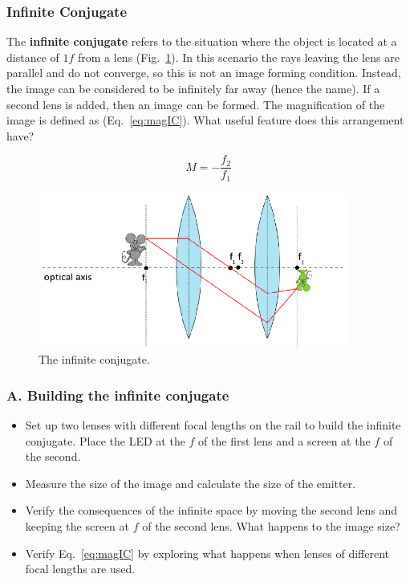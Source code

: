 \documentclass[a4paper]{report}
\begin{document}
\subsubsection{Infinite Conjugate}
The \textbf{infinite conjugate} refers to the situation where the
object is located at a distance of $1f$ from a lens
(Fig.~\ref{infiniteConjugate}). In this scenario the rays leaving the
lens are parallel and do not converge, so this is not an image forming
condition. Instead, the image can be considered to be infinitely far
away (hence the name). If a second lens is added, then an image can
be formed. The magnification of the image is defined as
(Eq.~\ref{eq:magIC}). 
What useful feature does this arrangement have? 

\begin{equation}
M=-\frac{f_2}{f_1}
\label{eq:magIC}
\end{equation}

\begin{figure}[h]
\center
\includegraphics[width=4in]{infiniteConjugate.eps}
\caption{The infinite conjugate.}
\label{infiniteConjugate}
\end{figure}
\subsubsection{A. Building the infinite conjugate}
\begin{itemize}
\item Set up two lenses with different focal lengths on the rail to build the infinite conjugate. 
Place the LED at the $f$ of the first lens and a screen at the $f$ of the second. 
\item Measure the size of the image and calculate the size of the emitter. 
\item Verify the consequences of the infinite space by moving the second lens and keeping the screen at $f$ of the second lens. 
What happens to the image size?
\item Verify Eq.~\ref{eq:magIC} by exploring what happens when lenses of different focal lengths are used. 
\end{itemize}
\end{document}
